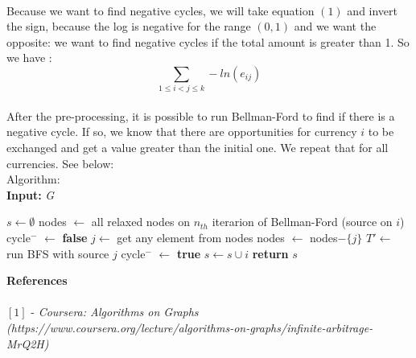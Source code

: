 \documentclass{article}
\begin{document}
\\
Because we want to find negative cycles, we will take equation $(1)$ and invert the sign, because the log is negative for the range $(0, 1)$ and we want the opposite: we want to find negative cycles if the total amount is greater than 1. So we have :
\begin{equation}
\sum_{1 \leq i < j \leq k} - ln(e_{ij}) 
\end{equation}
\\
After the pre-processing, it is possible to run Bellman-Ford to find if there is a negative cycle. If so, we know that there are opportunities for currency $i$ to be exchanged and get a value greater than the initial one. We repeat that for all currencies. See below:
\\
Algorithm:\\
\textbf{Input:} \textit{G}
\begin{algorithmic}
\State $s \gets \emptyset$
  \State nodes $\gets$ all relaxed nodes on $n_{th}$ iterarion of Bellman-Ford (source on $i$)
  \State cycle$^{-}$ $\gets$ \textbf{false}
    \State $j \gets $ get any element from nodes
    \State nodes $\gets$ nodes$- \{j\}$
    \State $T' \gets $ run BFS with source $j$
      \State cycle$^{-}$ $\gets$ \textbf{true}
    \EndIf
  \EndWhile
    \State $s \gets s \cup {i}$
  \EndIf
\EndFor
\State \textbf{return} $s$
\end{algorithmic}
\textbf{References}
\\
\\ $[1]$ - \textit{Coursera: Algorithms on Graphs (https://www.coursera.org/lecture/algorithms-on-graphs/infinite-arbitrage-MrQ2H)}
\end{document}

